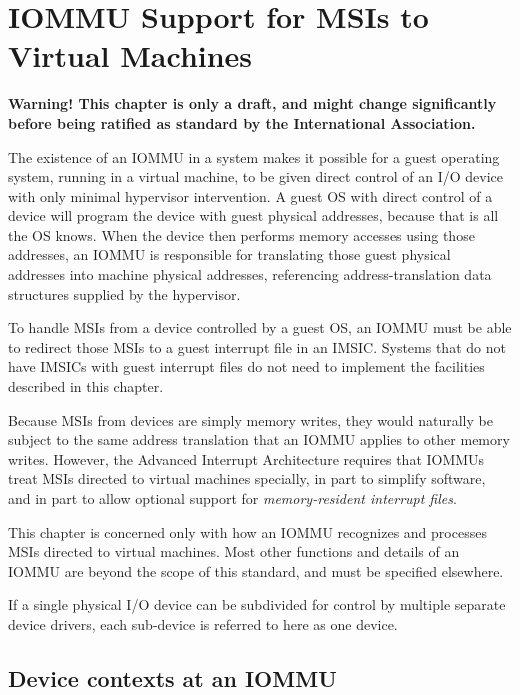 
\chapter{IOMMU Support for MSIs to Virtual Machines}
\label{ch:IOMMU}

\textbf{%
Warning!
This chapter is only a draft, and might change significantly before
being ratified as standard by the {\RISCV} International Association.%
}
\bigskip

The existence of an \mbox{IOMMU} in a system makes it possible for a guest
operating system, running in a virtual machine, to be given direct
control of an I/O device with only minimal hypervisor intervention.
A guest OS with direct control of a device will program the device with
guest physical addresses, because that is all the OS knows.
When the device then performs memory accesses using those addresses, an
\mbox{IOMMU} is responsible for translating those guest physical addresses
into machine physical addresses, referencing address-translation data
structures supplied by the hypervisor.

To handle MSIs from a device controlled by a guest OS, an \mbox{IOMMU} must
be able to redirect those MSIs to a guest interrupt file in an IMSIC.
Systems that do not have IMSICs with guest interrupt files do not need
to implement the facilities described in this chapter.

Because MSIs from devices are simply memory writes, they would
naturally be subject to the same address translation that an \mbox{IOMMU}
applies to other memory writes.
However, the Advanced Interrupt Architecture requires that \mbox{IOMMU}s
treat MSIs directed to virtual machines specially, in part to
simplify software, and in part to allow optional support for
\emph{memory-resident interrupt files}.

This chapter is concerned only with how an \mbox{IOMMU} recognizes and
processes MSIs directed to virtual machines.
Most other functions and details of an \mbox{IOMMU} are beyond the scope of
this standard, and must be specified elsewhere.

If a single physical I/O device can be subdivided for
control by multiple separate device drivers,
each sub-device is referred to here as one device.

\section{Device contexts at an IOMMU}
\label{sec:IOMMU-deviceContexts}


